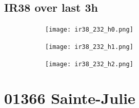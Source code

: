 \documentclass{article}
\begin{document}
\vspace{-1em}
\subsection*{IR38 over last 3h}
\vspace{-1em}
\begin{figure}[H]
    \centering
    \begin{subfigure}[b]{0.32\textwidth}
        \centering
        \texttt{[image: ir38\_232\_h0.png]} %
    \end{subfigure}
    \begin{subfigure}[b]{0.32\textwidth}
        \centering
        \texttt{[image: ir38\_232\_h1.png]} %
    \end{subfigure}
    \begin{subfigure}[b]{0.32\textwidth}
        \centering
        \texttt{[image: ir38\_232\_h2.png]} %
    \end{subfigure}
\end{figure}

\vspace{-1em}
\section*{01366 Sainte-Julie}
\vspace{-1em}
\end{document}
